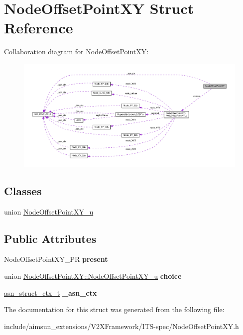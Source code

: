 \hypertarget{structNodeOffsetPointXY}{}\section{Node\+Offset\+Point\+XY Struct Reference}
\label{structNodeOffsetPointXY}


Collaboration diagram for Node\+Offset\+Point\+XY\+:\nopagebreak
\begin{figure}[H]
\begin{center}
\leavevmode
\includegraphics[width=350pt]{structNodeOffsetPointXY__coll__graph}
\end{center}
\end{figure}
\subsection*{Classes}
\begin{DoxyCompactItemize}
\item 
union \hyperlink{unionNodeOffsetPointXY_1_1NodeOffsetPointXY__u}{Node\+Offset\+Point\+X\+Y\+\_\+u}
\end{DoxyCompactItemize}
\subsection*{Public Attributes}
\begin{DoxyCompactItemize}
\item 
Node\+Offset\+Point\+X\+Y\+\_\+\+PR {\bfseries present}\hypertarget{structNodeOffsetPointXY_ac705ffff24f10dbc1021e310a5a539f1}{}\label{structNodeOffsetPointXY_ac705ffff24f10dbc1021e310a5a539f1}

\item 
union \hyperlink{unionNodeOffsetPointXY_1_1NodeOffsetPointXY__u}{Node\+Offset\+Point\+X\+Y\+::\+Node\+Offset\+Point\+X\+Y\+\_\+u} {\bfseries choice}\hypertarget{structNodeOffsetPointXY_aca7571eff75858b778fd957136261ff9}{}\label{structNodeOffsetPointXY_aca7571eff75858b778fd957136261ff9}

\item 
\hyperlink{structasn__struct__ctx__s}{asn\+\_\+struct\+\_\+ctx\+\_\+t} {\bfseries \+\_\+asn\+\_\+ctx}\hypertarget{structNodeOffsetPointXY_a09d161400d62c091a49b36219de05ff2}{}\label{structNodeOffsetPointXY_a09d161400d62c091a49b36219de05ff2}

\end{DoxyCompactItemize}


The documentation for this struct was generated from the following file\+:\begin{DoxyCompactItemize}
\item 
include/aimsun\+\_\+extensions/\+V2\+X\+Framework/\+I\+T\+S-\/spec/Node\+Offset\+Point\+X\+Y.\+h\end{DoxyCompactItemize}

